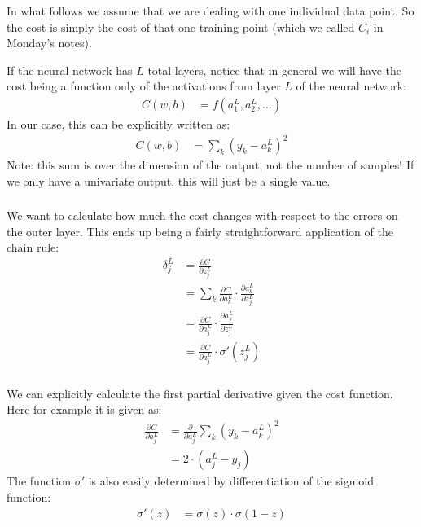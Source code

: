 \documentclass[xetex,mathserif,serif,aspectratio=169]{beamer}
\begin{document}
\begin{frame}[fragile] \frametitle{} \oldB \small


In what follows we assume that we are dealing with one individual
data point. So the cost is simply the cost of that one training
point (which we called $C_i$ in Monday's notes).

If the neural network has $L$ total layers, notice that in
general we will have the cost being a function only of the
activations from layer $L$ of the neural network:
\begin{align*}
C(w, b) &= f(a_1^L, a_2^L, \ldots)
\end{align*}
In our case, this can be explicitly written as:
\begin{align*}
C(w, b) &= \sum_k (y_k - a_k^L)^2
\end{align*}
Note: this sum is over the dimension of the output, not the
number of samples! If we only have a univariate output, this
will just be a single value.

\end{frame}

\begin{frame}[fragile] \frametitle{} \oldB \small


We want to calculate how much the cost changes with respect to the
errors on the outer layer. This ends up being a fairly straightforward
application of the chain rule:
\begin{align*}
\delta_j^L &= \frac{\partial C}{ \partial z_j^L} \\
&= \sum_k \frac{\partial C}{ \partial a_k^L} \cdot \frac{\partial a_k^L}{ \partial z_j^L} \\
&= \frac{\partial C}{ \partial a_j^L} \cdot \frac{\partial a_j^L}{ \partial z_j^L} \\
&= \frac{\partial C}{ \partial a_j^L} \cdot \sigma'(z_j^L)
\end{align*}

\end{frame}

\begin{frame}[fragile] \frametitle{} \oldB \small


We can explicitly calculate the first partial derivative given the cost
function. Here for example it is given as:
\begin{align*}
\frac{\partial C}{ \partial a_j^L} &= \frac{\partial}{ \partial a_j^L} \sum_k (y_k - a_k^L)^2 \\
&= 2 \cdot (a_j^L - y_j)
\end{align*}
The function $\sigma'$ is also easily determined by differentiation of the sigmoid
function:
\begin{align*}
\sigma'(z) &= \sigma(z) \cdot \sigma(1 - z)
\end{align*}

\end{frame}
\end{document}
